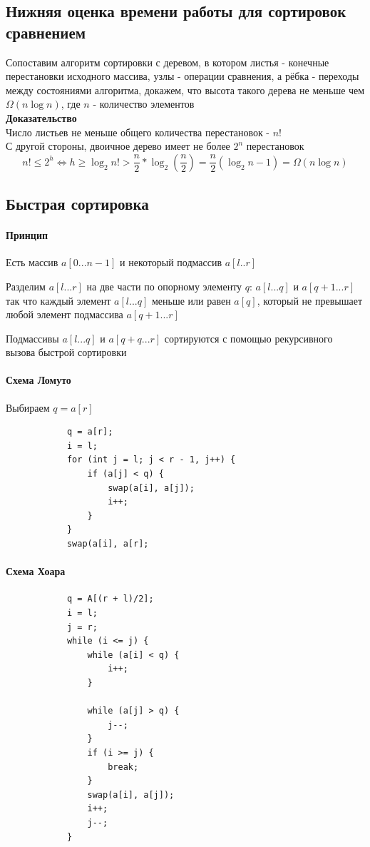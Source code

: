 \documentclass[a4paper,10pt]{article}
\begin{document}
	\subsection{Нижняя оценка времени работы для сортировок сравнением}
	Сопоставим алгоритм сортировки с деревом, в котором листья - конечные перестановки исходного массива, узлы - операции сравнения, а рёбка - переходы между состояниями алгоритма, докажем, что высота такого дерева не меньше чем $\Omega(n \log n)$, где $n$ - количество элементов \\
	\textbf{Доказательство} \\
	Число листьев не меньше общего количества перестановок - $n!$ \\
	С другой стороны, двоичное дерево имеет не более $2^n$ перестановок \\
	\[
		n! \leq 2^h \Leftrightarrow h \geq \log_2 n! > \frac{n}{2}*\log_2(\frac{n}{2}) = \frac{n}{2}(\log_2 n - 1) = \Omega(n \log n)
	\]
	\subsection{Быстрая сортировка}
	\paragraph{Принцип}
	Есть массив $a[0...n-1]$ и некоторый подмассив $a[l..r]$
	\begin{center}
		\item Разделим $a[l...r]$ на две части по опорному элементу $q$: $a[l...q]$ и $a[q+1...r]$ так что каждый элемент $a[l...q]$ меньше или равен $a[q]$, который не превышает любой элемент подмассива $a[q+1...r]$
		\item Подмассивы $a[l...q]$ и $a[q+q...r]$ сортируются с помощью рекурсивного вызова быстрой сортировки
	\end{center}
	\paragraph{Схема Ломуто}
	\begin{center}
		\item Выбираем $q = a[r]$
		\begin{lstlisting}
			q = a[r];
			i = l;
			for (int j = l; j < r - 1, j++) {
				if (a[j] < q) {
					swap(a[i], a[j]);
					i++;
				}
			}
			swap(a[i], a[r];
		\end{lstlisting}
	\end{center}
	\newpage
	\paragraph{Схема Хоара}
	\begin{center}
		\begin{lstlisting}
			q = A[(r + l)/2];
			i = l;
			j = r;
			while (i <= j) {
				while (a[i] < q) {
					i++;
				}
				
				while (a[j] > q) {
					j--;
				}
				if (i >= j) {
					break;
				}
				swap(a[i], a[j]);
				i++;
				j--;
			}
		\end{lstlisting}
	\end{center}
\end{document}
